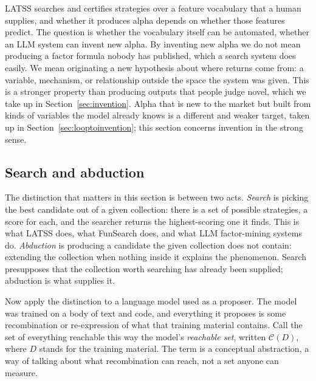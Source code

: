 \documentclass[11pt]{article}
\begin{document}
LATSS searches and certifies strategies over a feature vocabulary that a human supplies, and whether
it produces alpha depends on whether those features predict. The question is whether the vocabulary
itself can be automated, whether an LLM system can invent new alpha. By inventing new alpha we do not
mean producing a factor formula nobody has published, which a search system does easily. We mean
originating a new hypothesis about where returns come from: a variable, mechanism, or relationship
outside the space the system was given. This is a stronger property than producing outputs that people
judge novel, which we take up in Section~\ref{sec:invention}. Alpha that is new to the market but built
from kinds of variables the model already knows is a different and weaker target, taken up in
Section~\ref{sec:looptoinvention}; this section concerns invention in the strong sense.

\subsection{Search and abduction}
\label{sec:formal}

The distinction that matters in this section is between two acts. \emph{Search} is picking the best
candidate out of a given collection: there is a set of possible strategies, a score for each, and the
searcher returns the highest-scoring one it finds. This is what LATSS does, what FunSearch does, and
what LLM factor-mining systems do. \emph{Abduction} is producing a candidate the given collection does
not contain: extending the collection when nothing inside it explains the phenomenon. Search
presupposes that the collection worth searching has already been supplied; abduction is what supplies
it.

Now apply the distinction to a language model used as a proposer. The model was trained on a body of
text and code, and everything it proposes is some recombination or re-expression of what that training
material contains. Call the set of everything reachable this way the model's \emph{reachable set},
written $\mathcal{C}(D)$, where $D$ stands for the training material. The term is a conceptual
abstraction, a way of talking about what recombination can reach, not a set anyone can measure.
\end{document}
